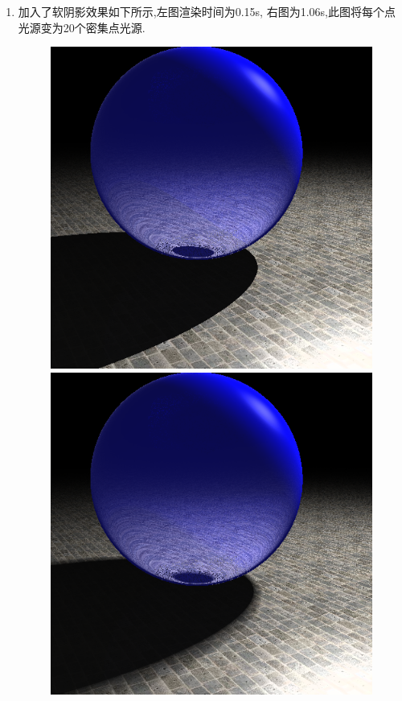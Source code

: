 \begin{enumerate}
\item 加入了软阴影效果如下所示,左图渲染时间为0.15s, 右图为1.06s,此图将每个点光源变为20个密集点光源.
\begin{figure}[H]
\begin{minipage}[b]{0.46\linewidth}
  \centering
  \includegraphics[width=\textwidth]{res/no_soft.png}
\end{minipage}
\begin{minipage}[b]{0.46\linewidth}
  \centering
  \includegraphics[width=\textwidth]{res/soft.png}
\end{minipage}
  \caption{\label{fig:soft}}
\end{figure}


\end{enumerate}
